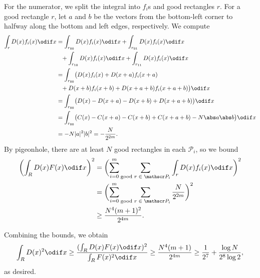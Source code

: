 \documentclass[11pt]{scrartcl}
\begin{document}
For the numerator, we split the integral into $f_i$s and good rectangles $r$. For a good rectangle $r$, let $a$ and $b$ be the vectors from the bottom-left corner to halfway along the bottom and left edges, respectively. We compute
\begin{align*}
    \int_rD(x)f_i(x) \odif x &= \int_{r_{00}}D(x)f_i(x) \odif x + \int_{r_{01}}D(x)f_i(x) \odif x \\
    &\phantom= + \int_{r_{10}}D(x)f_i(x) \odif x + \int_{r_{11}}D(x)f_i(x) \odif x \\
    &= \int_{r_{00}}\bigl(D(x)f_i(x) + D(x + a)f_i(x + a) \\
    &\phantom= + D(x + b)f_i(x + b) + D(x + a + b)f_i(x + a + b)\bigr) \odif x \\
    &= \int_{r_{00}}\bigl(D(x) - D(x + a) - D(x + b) + D(x + a + b)\bigr) \odif x \\
    &= \int_{r_{00}}\bigl(C(x) - C(x + a) - C(x + b) + C(x + a + b) - N\abs a\abs b\bigr) \odif x \\
    &= -N\lvert a\rvert^2\lvert b\rvert^2 = -\frac N{2^{2m}}.
\end{align*}
By pigeonhole, there are at least $N$ good rectangles in each $\mathscr P_i$, so we bound
\begin{align*}
    \biggl( \int_RD(x)F(x) \odif x \biggr)^2 &= \biggl( \sum_{i = 0}^m\sum_{\text{good $r \in \mathscr P_i$}}\int_rD(x)f_i(x) \odif x \biggr)^2 \\
    &= \biggl( \sum_{i = 0}^m\sum_{\text{good $r \in \mathscr P_i$}}\frac N{2^{2m}} \biggr)^2 \\
    &\ge \frac{N^4(m + 1)^2}{2^{4m}}.
\end{align*}

Combining the bounds, we obtain
\[\int_R D(x)^2\odif x \ge \frac{(\int_R D(x)F(x) \odif x)^2}{\int_R F(x)^2 \odif x} \ge \frac{N^4(m + 1)}{2^{4m}} \ge \frac1{2^7} + \frac{\log N}{2^8\log 2},\]
as desired.
\end{document}
